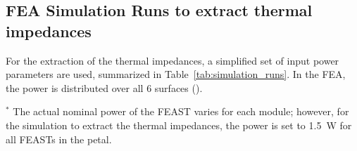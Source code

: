 \subsection{FEA Simulation Runs to extract thermal impedances}

For the extraction of the thermal impedances, a simplified set of input power parameters are used,
summarized in Table~\ref{tab:simulation_runs}.
In the FEA, the power is distributed over all 6 surfaces ().

\let\arraystretcha\arraystretch
\renewcommand\arraystretch{1.4} %
\begin{table}[h!]
\footnotesize
\begin{center}
\end{center}
\caption{ Description of the 3 thermal simulations required to obtain the thermal impedances.
}
\label{tab:simulation_runs}
\end{table}
\let\arraystretch\arraystretcha

$^*$ The actual nominal power of the FEAST varies for each module; however, for the simulation to extract
the thermal impedances, the power is set to 1.5~W for all FEASTs in the petal.\\






